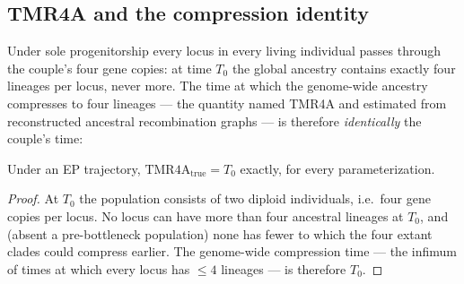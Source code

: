 \subsection{TMR4A and the compression identity}\label{sec:window}
Under sole progenitorship every locus in every living individual passes
through the couple's four gene copies: at time $T_0$ the global ancestry
contains exactly four lineages per locus, never more. The time at which the
genome-wide ancestry compresses to four lineages --- the quantity
\citet{Swamidass2019} named TMR4A and estimated from reconstructed
ancestral recombination graphs --- is therefore \emph{identically} the
couple's time:

\begin{proposition}\label{prop:tmr4a}
Under an EP trajectory, $\mathrm{TMR4A}_{\mathrm{true}} = T_0$ exactly, for
every parameterization.
\end{proposition}

\begin{proof}
At $T_0$ the population consists of two diploid individuals, i.e.\ four
gene copies per locus. No locus can have more than four ancestral lineages
at $T_0$, and (absent a pre-bottleneck population) none has fewer to which
the four extant clades could compress earlier. The genome-wide compression
time --- the infimum of times at which every locus has $\le 4$ lineages ---
is therefore $T_0$.
\end{proof}

